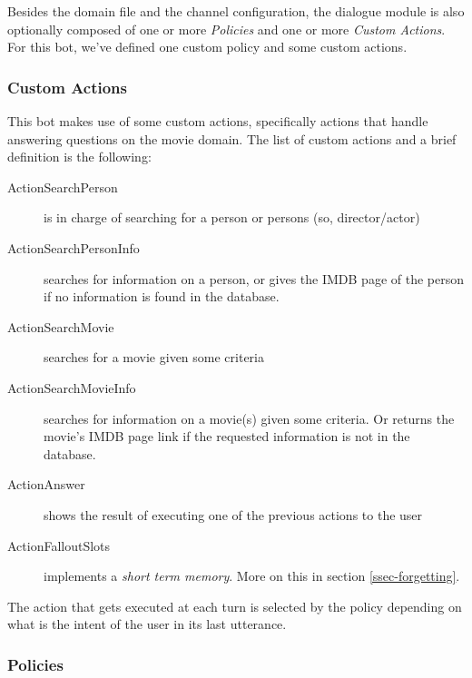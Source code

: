 \documentclass[11pt,a4paper]{article}
\begin{document}
			Besides the domain file and the channel configuration, the dialogue module is also optionally composed of one or more \textit{Policies} and one or more \textit{Custom Actions}. For this bot, we've defined one custom policy and some custom actions. 
			

		\subsubsection{Custom Actions}
		\label{ssec-custom-actions}	
			
			This bot makes use of some custom actions, specifically actions that handle answering questions on the movie domain. The list of custom actions and a brief definition is the following:
			
			\begin{description}
				\item[ActionSearchPerson] 
				is in charge of searching for a person or persons (so, director/actor)
				
				\item[ActionSearchPersonInfo] 
				searches for information on a person, or gives the IMDB page of the person if no information is found in the database.
				
				\item[ActionSearchMovie] 
				searches for a movie given some criteria
				
				\item[ActionSearchMovieInfo] 
				searches for information on a movie(s) given some criteria. Or returns the movie's IMDB page link if the requested information is not in the database.
				
				\item[ActionAnswer] 
				shows the result of executing one of the previous actions to the user
				
				\item[ActionFalloutSlots] 
				implements a \textit{short term memory}. More on this in section \ref{ssec-forgetting}.
				
				
			\end{description}
			
			The action that gets executed at each turn is selected by the policy depending on what is the intent of the user in its last utterance. 

		\subsubsection{Policies}
		\label{ssec-policies}	
			
\end{document}

